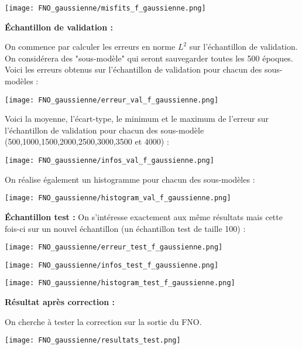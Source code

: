 \begin{minipage}{\linewidth}
	\centering
	\texttt{[image: FNO\_gaussienne/misfits\_f\_gaussienne.png]}
\end{minipage}

\textbf{Échantillon de validation :}

On commence par calculer les erreurs en norme $L^2$ sur l'échantillon de validation. On considérera des "sous-modèle" qui seront sauvegarder toutes les 500 époques. Voici les erreurs obtenus sur l'échantillon de validation pour chacun des sous-modèles :

\begin{minipage}{\linewidth}
	\centering
	\texttt{[image: FNO\_gaussienne/erreur\_val\_f\_gaussienne.png]}
\end{minipage}

Voici la moyenne, l'écart-type, le minimum et le maximum de l'erreur sur l'échantillon de validation pour chacun des sous-modèle (500,1000,1500,2000,2500,3000,3500 et 4000) :

\begin{minipage}{\linewidth}
	\centering
	\texttt{[image: FNO\_gaussienne/infos\_val\_f\_gaussienne.png]}
\end{minipage}

On réalise également un histogramme pour chacun des sous-modèles : 

\begin{minipage}{\linewidth}
	\centering
	\texttt{[image: FNO\_gaussienne/histogram\_val\_f\_gaussienne.png]}
\end{minipage}

\textbf{Échantillon test :}
On s'intéresse exactement aux même résultats mais cette fois-ci sur un nouvel échantillon (un échantillon test de taille 100) :

\begin{minipage}{\linewidth}
	\centering
	\texttt{[image: FNO\_gaussienne/erreur\_test\_f\_gaussienne.png]}
\end{minipage}

\begin{minipage}{\linewidth}
	\centering
	\texttt{[image: FNO\_gaussienne/infos\_test\_f\_gaussienne.png]}
\end{minipage}

\begin{minipage}{\linewidth}
	\centering
	\texttt{[image: FNO\_gaussienne/histogram\_test\_f\_gaussienne.png]}
\end{minipage}

\textbf{Résultat après correction : }

On cherche à tester la correction sur la sortie du FNO. 

\begin{minipage}{\linewidth}
	\centering
	\texttt{[image: FNO\_gaussienne/resultats\_test.png]}
\end{minipage}